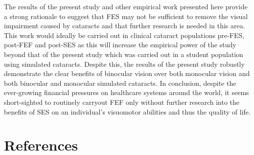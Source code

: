 \documentclass[
  english,
  man,floatsintext]{apa6}
\begin{document}
The results of the present study and other empirical work presented here provide a strong rationale to suggest that FES may not be sufficient to remove the visual impairment caused by cataracts and that further research is needed in this area.
This work would ideally be carried out in clinical cataract populations pre-FES, post-FEF and post-SES as this will increase the empirical power of the study beyond that of the present study which was carried out in a student population using simulated cataracts.
Despite this, the results of the present study robustly demonstrate the clear benefits of binocular vision over both monocular vision and both binocular and monocular simulated cataracts.
In conclusion, despite the ever-growing financial pressures on healthcare systems around the world, it seems short-sighted to routinely carryout FEF only without further research into the benefits of SES on an individual's visuomotor abilities and thus the quality of life.

\newpage

\hypertarget{references}{%
\section{References}\label{references}}

\begingroup
\setlength{\parindent}{-0.5in}
\setlength{\leftskip}{0.5in}

\hypertarget{refs}{}

\endgroup
\end{document}
